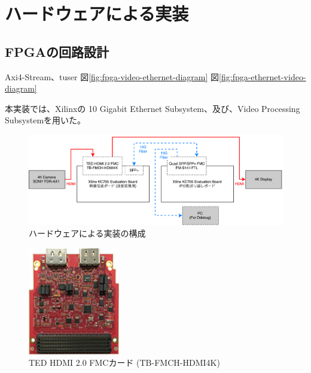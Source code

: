 \section{ハードウェアによる実装}

\subsection{FPGAの回路設計}

Axi4-Stream、tuser
図\ref{fig:fpga-video-ethernet-diagram}
図\ref{fig:fpga-ethernet-video-diagram}

本実装では、Xilinxの 10 Gigabit Ethernet Subsystem、及び、Video Processing Subsystemを用いた。

\begin{figure}[htbp]
    \begin{center}
        \includegraphics[bb=0 0 841 299,width=15.5cm]{img/fpga-implement-flow.pdf}
    \end{center}
    \caption{ハードウェアによる実装の構成}
    \label{fig:fpga-implement-flow}
\end{figure}


\begin{figure}[htbp]
    \begin{center}
        \includegraphics[bb=0 0 137 161,width=4cm]{img/ted-4k-fmc-card.jpg}
    \end{center}
    \caption{TED HDMI 2.0 FMCカード (TB-FMCH-HDMI4K)}
    \label{fig:ted-4k-fmc-card}
\end{figure}

